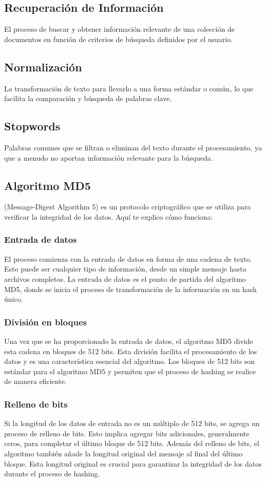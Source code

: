 \subsection{Recuperación de Información}
El proceso de buscar y obtener información relevante de una colección de documentos en función de criterios de búsqueda definidos por el usuario.
\subsection{Normalización}
La transformación de texto para llevarlo a una forma estándar o común, lo que facilita la comparación y búsqueda de palabras clave.
\subsection{Stopwords}
Palabras comunes que se filtran o eliminan del texto durante el procesamiento, ya que a menudo no aportan información relevante para la búsqueda.
\subsection{Algoritmo MD5}
(Message-Digest Algorithm 5) es un protocolo criptográfico que se utiliza para verificar la integridad de los datos. Aquí te explico cómo funciona:
\subsubsection{Entrada de datos}
El proceso comienza con la entrada de datos en forma de una cadena de texto. Esto puede ser cualquier tipo de información, desde un simple mensaje hasta archivos completos. La entrada de datos es el punto de partida del algoritmo MD5, donde se inicia el proceso de transformación de la información en un hash único.
\subsubsection{División en bloques}
Una vez que se ha proporcionado la entrada de datos, el algoritmo MD5 divide esta cadena en bloques de 512 bits. Esta división facilita el procesamiento de los datos y es una característica esencial del algoritmo. Los bloques de 512 bits son estándar para el algoritmo MD5 y permiten que el proceso de hashing se realice de manera eficiente.
\subsubsection{Relleno de bits}
Si la longitud de los datos de entrada no es un múltiplo de 512 bits, se agrega un proceso de relleno de bits. Esto implica agregar bits adicionales, generalmente ceros, para completar el último bloque de 512 bits. Además del relleno de bits, el algoritmo también añade la longitud original del mensaje al final del último bloque. Esta longitud original es crucial para garantizar la integridad de los datos durante el proceso de hashing.
